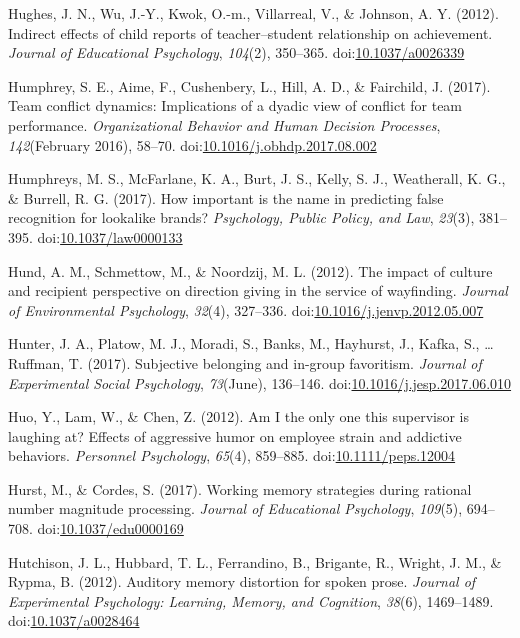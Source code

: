 \documentclass[english,man]{apa6}
\begin{document}
\hypertarget{ref-Hughes2012}{}
Hughes, J. N., Wu, J.-Y., Kwok, O.-m., Villarreal, V., \& Johnson, A. Y.
(2012). Indirect effects of child reports of teacher--student
relationship on achievement. \emph{Journal of Educational Psychology},
\emph{104}(2), 350--365.
doi:\href{https://doi.org/10.1037/a0026339}{10.1037/a0026339}

\hypertarget{ref-Humphrey2017}{}
Humphrey, S. E., Aime, F., Cushenbery, L., Hill, A. D., \& Fairchild, J.
(2017). Team conflict dynamics: Implications of a dyadic view of
conflict for team performance. \emph{Organizational Behavior and Human
Decision Processes}, \emph{142}(February 2016), 58--70.
doi:\href{https://doi.org/10.1016/j.obhdp.2017.08.002}{10.1016/j.obhdp.2017.08.002}

\hypertarget{ref-Humphreys2017}{}
Humphreys, M. S., McFarlane, K. A., Burt, J. S., Kelly, S. J.,
Weatherall, K. G., \& Burrell, R. G. (2017). How important is the name
in predicting false recognition for lookalike brands? \emph{Psychology,
Public Policy, and Law}, \emph{23}(3), 381--395.
doi:\href{https://doi.org/10.1037/law0000133}{10.1037/law0000133}

\hypertarget{ref-Hund2012}{}
Hund, A. M., Schmettow, M., \& Noordzij, M. L. (2012). The impact of
culture and recipient perspective on direction giving in the service of
wayfinding. \emph{Journal of Environmental Psychology}, \emph{32}(4),
327--336.
doi:\href{https://doi.org/10.1016/j.jenvp.2012.05.007}{10.1016/j.jenvp.2012.05.007}

\hypertarget{ref-Hunter2017}{}
Hunter, J. A., Platow, M. J., Moradi, S., Banks, M., Hayhurst, J.,
Kafka, S., \ldots{} Ruffman, T. (2017). Subjective belonging and
in-group favoritism. \emph{Journal of Experimental Social Psychology},
\emph{73}(June), 136--146.
doi:\href{https://doi.org/10.1016/j.jesp.2017.06.010}{10.1016/j.jesp.2017.06.010}

\hypertarget{ref-Huo2012}{}
Huo, Y., Lam, W., \& Chen, Z. (2012). Am I the only one this supervisor
is laughing at? Effects of aggressive humor on employee strain and
addictive behaviors. \emph{Personnel Psychology}, \emph{65}(4),
859--885.
doi:\href{https://doi.org/10.1111/peps.12004}{10.1111/peps.12004}

\hypertarget{ref-Hurst2017}{}
Hurst, M., \& Cordes, S. (2017). Working memory strategies during
rational number magnitude processing. \emph{Journal of Educational
Psychology}, \emph{109}(5), 694--708.
doi:\href{https://doi.org/10.1037/edu0000169}{10.1037/edu0000169}

\hypertarget{ref-Hutchison2012}{}
Hutchison, J. L., Hubbard, T. L., Ferrandino, B., Brigante, R., Wright,
J. M., \& Rypma, B. (2012). Auditory memory distortion for spoken prose.
\emph{Journal of Experimental Psychology: Learning, Memory, and
Cognition}, \emph{38}(6), 1469--1489.
doi:\href{https://doi.org/10.1037/a0028464}{10.1037/a0028464}
\end{document}
